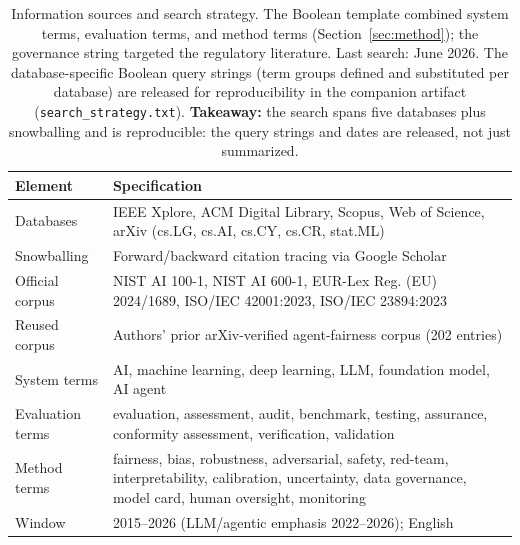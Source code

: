 \begin{table}[!tbp]
\centering
\caption{Information sources and search strategy. The Boolean template combined system
terms, evaluation terms, and method terms (Section~\ref{sec:method}); the governance
string targeted the regulatory literature. Last search: June 2026. The
database-specific Boolean query strings (term groups defined and substituted per database) are
released for reproducibility in the companion artifact
(\texttt{search\_strategy.txt}). \textbf{Takeaway:} the search spans five databases plus
snowballing and is reproducible: the query strings and dates are released, not just
summarized.}
\label{tab:search}
\footnotesize
\begin{tabular}{p{}p{}}
\toprule
Element & Specification\\
\midrule
Databases & IEEE Xplore, ACM Digital Library, Scopus, Web of Science, arXiv (cs.LG, cs.AI, cs.CY, cs.CR, stat.ML)\\
Snowballing & Forward/backward citation tracing via Google Scholar\\
Official corpus & NIST AI 100-1, NIST AI 600-1, EUR-Lex Reg. (EU) 2024/1689, ISO/IEC 42001:2023, ISO/IEC 23894:2023\\
Reused corpus & Authors' prior arXiv-verified agent-fairness corpus (202 entries)\\
System terms & AI, machine learning, deep learning, LLM, foundation model, AI agent\\
Evaluation terms & evaluation, assessment, audit, benchmark, testing, assurance, conformity assessment, verification, validation\\
Method terms & fairness, bias, robustness, adversarial, safety, red-team, interpretability, calibration, uncertainty, data governance, model card, human oversight, monitoring\\
Window & 2015--2026 (LLM/agentic emphasis 2022--2026); English\\
\bottomrule
\end{tabular}
\end{table}
